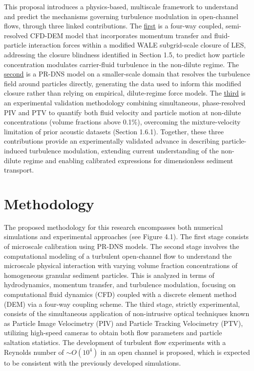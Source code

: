 This proposal introduces a physics-based, multiscale framework to understand and predict the mechanisms governing turbulence modulation in open-channel flows, through three linked contributions. The \underline{first} is a four-way coupled, semi-resolved CFD-DEM model that incorporates momentum transfer and fluid-particle interaction forces within a modified WALE subgrid-scale closure of LES, addressing the closure blindness identified in Section 1.5, to predict how particle concentration modulates carrier-fluid turbulence in the non-dilute regime. The \underline{second} is a PR-DNS model on a smaller-scale domain that resolves the turbulence field around particles directly, generating the data used to inform this modified closure rather than relying on empirical, dilute-regime force models. The \underline{third} is an experimental validation methodology combining simultaneous, phase-resolved PIV and PTV to quantify both fluid velocity and particle motion at non-dilute concentrations (volume fractions above 0.1\%), overcoming the mixture-velocity limitation of prior acoustic datasets (Section 1.6.1). Together, these three contributions provide an experimentally validated advance in describing particle-induced turbulence modulation, extending current understanding of the non-dilute regime and enabling calibrated expressions for dimensionless sediment transport.

\hypertarget{methodology}{%
\section{Methodology}\label{methodology}}

The proposed methodology for this research encompasses both numerical simulations and experimental approaches (see Figure 4.1). The first stage consists of microscale calibration using PR-DNS models. The second stage involves the computational modeling of a turbulent open-channel flow to understand the microscale physical interaction with varying volume fraction concentrations of homogeneous granular sediment particles. This is analyzed in terms of hydrodynamics, momentum transfer, and turbulence modulation, focusing on computational fluid dynamics (CFD) coupled with a discrete element method (DEM) via a four-way coupling scheme. The third stage, strictly experimental, consists of the simultaneous application of non-intrusive optical techniques known as Particle Image Velocimetry (PIV) and Particle Tracking Velocimetry (PTV), utilizing high-speed cameras to obtain both flow parameters and particle saltation statistics. The development of turbulent flow experiments with a Reynolds number of \(\sim O\left( 10^{4} \right)\) in an open channel is proposed, which is expected to be consistent with the previously developed simulations.

